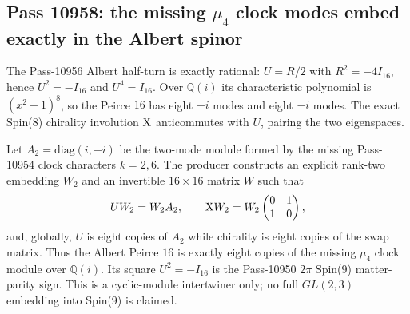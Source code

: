 \subsection{Pass 10958: the missing $\mu_4$ clock modes embed exactly in the Albert spinor}

The Pass-10956 Albert half-turn is exactly rational:
$U=R/2$ with $R^2=-4I_{16}$, hence $U^2=-I_{16}$ and $U^4=I_{16}$.
Over $\mathbb Q(i)$ its characteristic polynomial is
$(x^2+1)^8$, so the Peirce $16$ has eight $+i$ modes and eight $-i$
modes.  The exact Spin(8) chirality involution $\mathrm{X}$ anticommutes with
$U$, pairing the two eigenspaces.

Let $A_2=\mathrm{diag}(i,-i)$ be the two-mode module formed by the missing
Pass-10954 clock characters $k=2,6$.  The producer constructs an explicit
rank-two embedding $W_2$ and an invertible $16\times16$ matrix $W$ such that
\[
UW_2=W_2A_2,\qquad \mathrm{X} W_2=W_2
\begin{pmatrix}0&1\\1&0\end{pmatrix},
\]
and, globally, $U$ is eight copies of $A_2$ while chirality is eight copies
of the swap matrix.  Thus the Albert Peirce $16$ is exactly eight copies of
the missing $\mu_4$ clock module over $\mathbb Q(i)$.  Its square
$U^2=-I_{16}$ is the Pass-10950 $2\pi$ Spin(9) matter-parity sign.
This is a cyclic-module intertwiner only; no full $GL(2,3)$ embedding into
Spin(9) is claimed.
